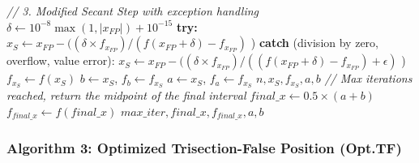 \documentclass[amsmath, amssymb, aps]{revtex4-2}
\begin{document}
\begin{algorithmic}[1]
        \State \textit{// 3. Modified Secant Step with exception handling}
        \State $\delta \gets 10^{-8} \max(1, |x_{FP}|) + 10^{-15}$
        \State \textbf{try:}
        \State \quad $x_S \gets x_{FP} - ( (\delta \times f_{x_{FP}}) / (f(x_{FP} + \delta) - f_{x_{FP}})$ )
        \State \textbf{catch} (division by zero, overflow, value error):
        \State \quad $x_S \gets x_{FP} - ( ( \delta \times f_{x_{FP}}) / ((f(x_{FP} + \delta) - f_{x_{FP}}) + \epsilon)$ )
            \State $f_{x_S} \gets f(x_S)$
                    \State $b \gets x_S$, $f_b \gets f_{x_S}$
                \Else
                    \State $a \gets x_S$, $f_a \gets f_{x_S}$
                \EndIf
                    \State \Return $n, x_S, f_{x_S}, a, b$
                \EndIf
            \EndIf
        \EndIf
    \EndWhile
    \State \textit{// Max iterations reached, return the midpoint of the final interval}
    \State $final\_x \gets 0.5 \times (a + b)$
    \State $f_{final\_x} \gets f(final\_x)$
    \State \Return $max\_iter, final\_x, f_{final\_x}, a, b$
    \end{algorithmic}

\subsubsection{Algorithm 3: Optimized Trisection-False Position (Opt.TF)}
\end{document}

